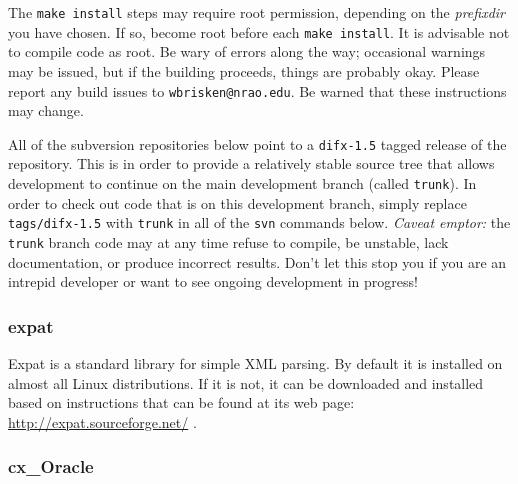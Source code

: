 The {\tt make install} steps may require root permission, depending on the {\em prefixdir} you have chosen.
If so, become root before each {\tt make install}.  
It is advisable not to compile code as root.
Be wary of errors along the way; occasional warnings may be issued, but if the building proceeds, things are probably okay.
Please report any build issues to {\tt wbrisken@nrao.edu}. 
Be warned that these instructions may change.

All of the subversion repositories below point to a {\tt difx-1.5} tagged release of the repository.
This is in order to provide a relatively stable source tree that allows development to continue on the main development branch (called {\tt trunk}).
In order to check out code that is on this development branch, simply replace {\tt tags/difx-1.5} with {\tt trunk} in all of the {\tt svn} commands below.
{\em Caveat emptor: } the {\tt trunk} branch code may at any time refuse to compile, be unstable, lack documentation, or produce incorrect results.
Don't let this stop you if you are an intrepid developer or want to see ongoing development in progress!










\subsubsection{expat} \label{sec:expat}

Expat is a standard library for simple XML parsing.
By default it is installed on almost all Linux distributions.
If it is not, it can be downloaded and installed based on instructions that can be found at its web page:
\url{http://expat.sourceforge.net/} .









\subsubsection{cx\_Oracle} \label{sec:cxOracle}

